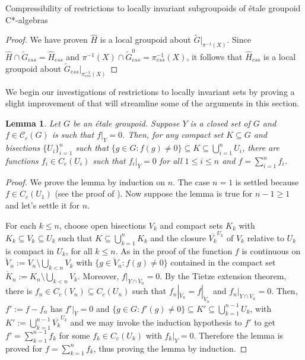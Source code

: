 \documentclass[a4paper, 12pt]{amsart}
\newtheorem{lem}[thm]{Lemma}
\theoremstyle{definition}
\theoremstyle{remark}
\numberwithin{equation}{section}
\begin{document}
\begin{section}{Compressibility of restrictions to locally invariant subgroupoids of \'etale groupoid C*-algebras}
\begin{proof}
    We have proven $\hat{H}$ is a local groupoid about $\tilde{G}|_{\pi^{-1}(X)}$. Since $\hat{H}\cap \tilde{G}_{ess} = \hat{H}_{ess}$ and $\pi^{-1}(X)\cap \tilde{G}^{0}_{ess} = \pi^{-1}_{ess}(X)$, it follows that $\hat{H}_{ess}$ is a local groupoid about $\tilde{G}_{ess}|_{\pi_{ess}^{-1}(X)}$
\end{proof}
We begin our investigations of restrictions to locally invariant sets by proving a slight improvement of \cite[Theorem~3.13]{BGHL25} that will streamline some of the arguments in this section.
\begin{lem}
\label{lem:PO1}
Let $G$ be an \'etale groupoid. Suppose $Y$ is a closed set of $G$ and $f\in\mathscr{C}_{c}(G)$ is such that $f|_{Y} = 0$. Then, for any compact set $K\subseteq G$ and bisections $\{U_{i}\}^{n}_{i=1}$ such that $\{g\in G:f(g)\neq 0\}\subseteq K\subseteq \bigcup^{n}_{i=1}U_{i}$, there are functions $f_{i}\in C_{c}(U_{i})$ such that $f_{i}|_{Y} = 0$ for all $1\leq i\leq n$ and $f = \sum^{n}_{i=1}f_{i}$.
\end{lem}
\begin{proof}

We prove the lemma by induction on $n$. The case $n = 1$ is settled because $f\in C_{c}(U_{1})$ (see the proof of \cite[Theorem~3.13(i)]{BGHL25}). Now suppose the lemma is true for $n -1 \geq 1$ and let's settle it for $n$.

For each $k\leq n$, choose open bisections $V_{k}$ and compact sets $K_{k}$ with $K_{k}\subseteq V_{k}\subseteq U_{k}$ such that $K\subseteq \bigcup^{n}_{k=1}K_{k}$ and the closure $\overline{V_{k}}^{U_{k}}$  of $V_{k}$ relative to $U_{k}$ is compact in $U_{k}$, for all $k\leq n$. As in the proof of \cite[Theorem~3.13(i)]{BGHL25} the function $f$ is continuous on $\check{V}_{n}:= V_{n}\setminus \bigcup_{k < n} V_{k}$ with $\{g\in \check{V}_{n}: f(g)\neq 0\}$ contained in the compact set $\check{K}_{n}:= K_{n}\setminus \bigcup_{k < n} V_{k}$. Moreover, $f|_{Y\cap \check{V}_{n}} = 0$. By the Tietze extension theorem, there is $f_{n}\in C_{c}(V_{n})\subseteq C_{c}(U_{n})$ such that $f_{n}|_{\check{V}_{n}} = f|_{\check{V}_{n}}$ and $f_{n}|_{Y\cap V_{n}} = 0$. Then, $f':= f - f_{n}$ has $f'|_{Y} = 0$ and $\{g\in G: f'(g)\neq 0\}\subseteq K' \subseteq \bigcup^{n-1}_{k=1} U_{k}$, with $K':= \bigcup^{n-1}_{k=1} \overline{V_{k}}^{U_{k}}$ and we may invoke the induction hypothesis to $f'$ to get $f' = \sum_{k=1}^{n-1}f_{k}$ for some $f_{k}\in C_{c}(U_{k})$ with $f_{k}|_{Y} = 0$. Therefore the lemma is proved for $f = \sum^{n}_{k=1}f_{k}$, thus proving the lemma by induction.
\end{proof}



\end{section}
\end{document}
